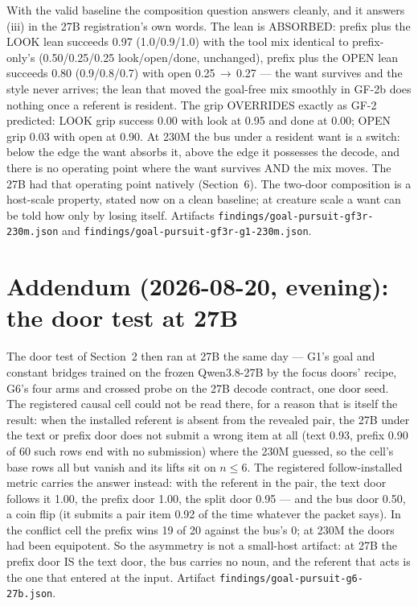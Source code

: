 \documentclass[11pt]{article}
\begin{document}
With the valid baseline the composition question answers cleanly, and
it answers (iii) in the 27B registration's own words. The lean is
ABSORBED: prefix plus the LOOK lean succeeds 0.97
(1.0/0.9/1.0) with the tool mix identical to prefix-only's
(0.50/0.25/0.25
look/open/done, unchanged), prefix plus the OPEN lean succeeds
0.80 (0.9/0.8/0.7) with open
0.25\,$\to$\,0.27
--- the want survives and the style never arrives; the lean that moved
the goal-free mix smoothly in GF-2b does nothing once a referent is
resident. The grip OVERRIDES exactly as GF-2 predicted: LOOK grip
success 0.00 with look at
0.95 and done at 0.00;
OPEN grip 0.03 with open at
0.90. At 230M the bus under a resident want
is a switch: below the edge the want absorbs it, above the edge it
possesses the decode, and there is no operating point where the want
survives AND the mix moves. The 27B had that operating point natively
(Section~6). The two-door composition is a host-scale property, stated
now on a clean baseline; at creature scale a want can be told how only
by losing itself. Artifacts \texttt{findings/goal-pursuit-gf3r-230m.json}
and \texttt{findings/goal-pursuit-gf3r-g1-230m.json}.

\section*{Addendum (2026-08-20, evening): the door test at 27B}

The door test of Section~2 then ran at 27B the same day --- G1's goal
and constant bridges trained on the frozen Qwen3.8-27B by the focus
doors' recipe, G6's four arms and crossed probe on the 27B decode
contract, one door seed. The registered causal cell could not be read
there, for a reason that is itself the result: when the installed
referent is absent from the revealed pair, the 27B under the text or
prefix door does not submit a wrong item at all (text
0.93, prefix 0.90 of
60 such rows end with no submission) where the 230M
guessed, so the cell's base rows all but vanish and its lifts sit on
$n \le 6$. The registered follow-installed metric carries the answer
instead: with the referent in the pair, the text door follows it
1.00, the prefix door 1.00, the
split door 0.95 --- and the bus door
0.50, a coin flip (it submits a pair item
0.92 of the time whatever the packet says). In the
conflict cell the prefix wins 19 of 20 against the
bus's 0; at 230M the doors had been equipotent. So the
asymmetry is not a small-host artifact: at 27B the prefix door IS the
text door, the bus carries no noun, and the referent that acts is the
one that entered at the input. Artifact
\texttt{findings/goal-pursuit-g6-27b.json}.
\end{document}
